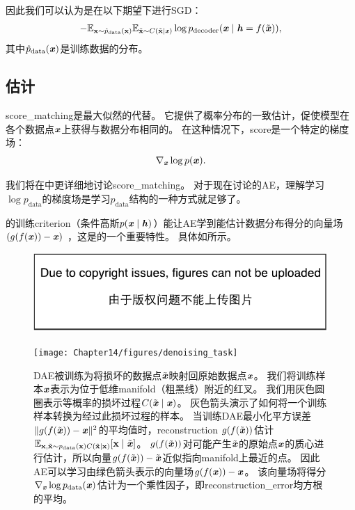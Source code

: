 因此我们可以认为是在以下期望下进行\gls{SGD}：
\begin{align}
   - \mathbb{E}_{\mathbf{x} \sim \hat{p}_{\text{data}}(\mathbf{x})} \mathbb{E}_{\tilde{\mathbf{x}} \sim C(\tilde{\mathbf{x}}\mid\boldsymbol{\mathit{x}})} \log p_{\text{decoder}}(\boldsymbol{\mathit{x}} \mid \boldsymbol{\mathit{h}} = f(\tilde{\boldsymbol{\mathit{x}}})),
\end{align}
其中$\hat{p}_{\text{data}}(\boldsymbol{\mathit{x}})$是训练数据的分布。


\subsection{估计}
\label{sec:estimating_the_score}
\gls{score_matching}\citep{Hyvarinen-2005}是最大似然的代替。
它提供了概率分布的一致估计，促使模型在各个数据点$\boldsymbol{\mathit{x}}$上获得与数据分布相同的。
在这种情况下，\gls{score}是一个特定的梯度场：
\begin{align}
 \nabla_{\boldsymbol{\mathit{x}}} \log p(\boldsymbol{\mathit{x}}) .
\end{align}

我们将在中更详细地讨论\gls{score_matching}。
对于现在讨论的\gls{AE}，理解学习$\log p_{\text{data}}$的梯度场是学习$p_{\text{data}}$结构的一种方式就足够了。


的训练\gls{criterion}（条件高斯$p(\boldsymbol{\mathit{x}} \mid \boldsymbol{\mathit{h}})$）能让\gls{AE}学到能估计数据分布得分的向量场$(g(f(\boldsymbol{\mathit{x}}))-\boldsymbol{\mathit{x}})$ ，这是的一个重要特性。
具体如所示。

\begin{figure}[!htb]
\ifOpenSource
\centerline{\includegraphics{figure.pdf}}
\else
\centerline{\texttt{[image: Chapter14/figures/denoising\_task]}}
\fi
\caption{\gls{DAE}被训练为将损坏的数据点$\tilde {\boldsymbol{\mathit{x}}}$映射回原始数据点$\boldsymbol{\mathit{x}}$。
我们将训练样本$\boldsymbol{\mathit{x}}$表示为位于低维\gls{manifold}（粗黑线）附近的红叉。
我们用灰色圆圈表示等概率的损坏过程$C(\tilde {\boldsymbol{\mathit{x}}} \mid \boldsymbol{\mathit{x}})$。
灰色箭头演示了如何将一个训练样本转换为经过此损坏过程的样本。
当训练\gls{DAE}最小化平方误差$\| g(f(\tilde {\boldsymbol{\mathit{x}}})) - \boldsymbol{\mathit{x}} \|^2$的平均值时，\gls{reconstruction} $g(f(\tilde {\boldsymbol{\mathit{x}}}))$估计$\mathbb{E}_{\mathbf{x}, \tilde{\mathbf{x}} \sim p_{\text{data}}(\mathbf{x}) C(\tilde{\mathbf{x}} \mid \mathbf{x})}[\mathbf{x} \mid \tilde{\boldsymbol{\mathit{x}}}]$。
$g(f(\tilde {\boldsymbol{\mathit{x}}}))$对可能产生$\tilde {\boldsymbol{\mathit{x}}}$的原始点$\boldsymbol{\mathit{x}}$的质心进行估计，所以向量$ g(f(\tilde {\boldsymbol{\mathit{x}}})) - \tilde {\boldsymbol{\mathit{x}}} $近似指向\gls{manifold}上最近的点。
因此\gls{AE}可以学习由绿色箭头表示的向量场$ g(f( \boldsymbol{\mathit{x}})) -  \boldsymbol{\mathit{x}} $。
该向量场将得分$\nabla_{\boldsymbol{\mathit{x}}} \log p_{\text{data}}(\boldsymbol{\mathit{x}})$估计为一个乘性因子，即\gls{reconstruction_error}均方根的平均。
}
\label{fig:chap14_denoising_task}
\end{figure}

